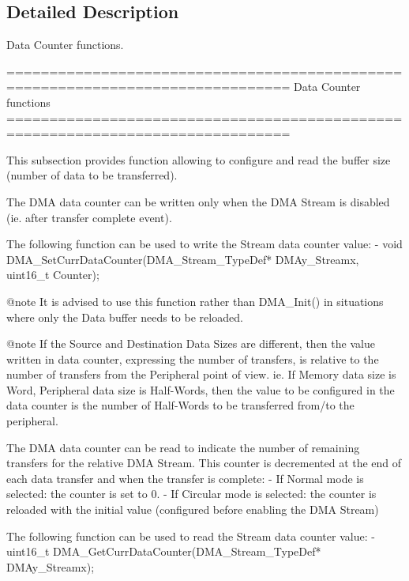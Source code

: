 \subsection{Detailed Description}
Data Counter functions. \begin{DoxyVerb} ===============================================================================
                           Data Counter functions
 ===============================================================================  

  This subsection provides function allowing to configure and read the buffer size
  (number of data to be transferred). 

  The DMA data counter can be written only when the DMA Stream is disabled 
  (ie. after transfer complete event).

  The following function can be used to write the Stream data counter value:
    - void DMA_SetCurrDataCounter(DMA_Stream_TypeDef* DMAy_Streamx, uint16_t Counter);

@note It is advised to use this function rather than DMA_Init() in situations where
      only the Data buffer needs to be reloaded.

@note If the Source and Destination Data Sizes are different, then the value written in
      data counter, expressing the number of transfers, is relative to the number of 
      transfers from the Peripheral point of view.
      ie. If Memory data size is Word, Peripheral data size is Half-Words, then the value
      to be configured in the data counter is the number of Half-Words to be transferred
      from/to the peripheral.

  The DMA data counter can be read to indicate the number of remaining transfers for
  the relative DMA Stream. This counter is decremented at the end of each data 
  transfer and when the transfer is complete: 
   - If Normal mode is selected: the counter is set to 0.
   - If Circular mode is selected: the counter is reloaded with the initial value
     (configured before enabling the DMA Stream)
   
  The following function can be used to read the Stream data counter value:
     - uint16_t DMA_GetCurrDataCounter(DMA_Stream_TypeDef* DMAy_Streamx);\end{DoxyVerb}
 

